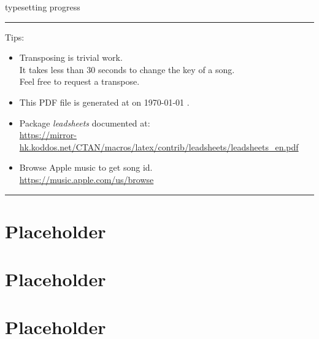 \documentclass{article}
\begin{document}


\par
{\ttfamily typesetting progress} \par
\bigskip

\label{lbtoc}
\newcommand{\cursec}[0]{}
\tableofcontents
\bigskip
\hrule
\bigskip
Tips:
\begin{itemize}
  \item Transposing is trivial work. \\ It takes less than 30 seconds to change the key of a song. \\ Feel free to request a transpose.
  \item This PDF file is generated at \textbraceleft{} \currenttime{} \textbraceright{} on \textbraceleft{} \today{} \textbraceright{}.
  \item Package \textit{leadsheets} documented at: \\ \url{https://mirror-hk.koddos.net/CTAN/macros/latex/contrib/leadsheets/leadsheets_en.pdf}
  \item Browse Apple music to get song id. \\ \url{https://music.apple.com/us/browse}
\end{itemize}
\hrule
\pagebreak

\section{Placeholder} \pagebreak

\section{Placeholder} \pagebreak

\section{Placeholder} \pagebreak
\end{document}
